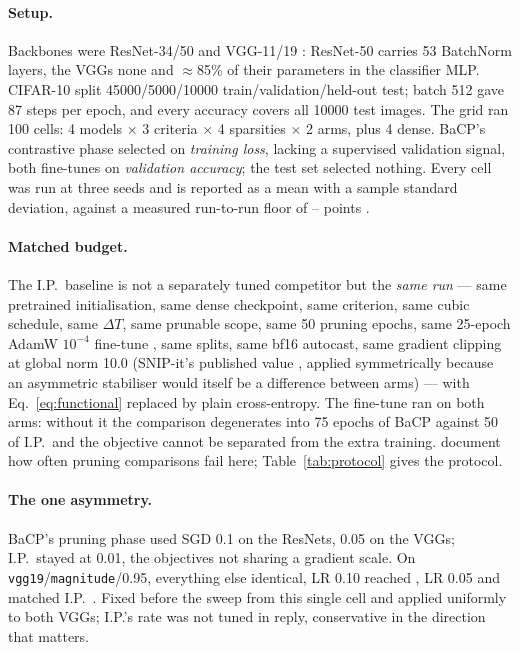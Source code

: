 \paragraph{Setup.}
Backbones were ResNet-34/50 \citep{he2016deep} and VGG-11/19
\citep{simonyan2015very}: ResNet-50 carries 53 BatchNorm layers, the VGGs none
and $\approx$85\% of their parameters in the classifier MLP. CIFAR-10
\citep{krizhevsky2009cifar} split \num{45000}/\num{5000}/\num{10000}
train/validation/held-out test; batch 512 gave 87 steps per epoch, and every
accuracy covers all \num{10000} test images. The grid ran 100 cells: 4 models
$\times$ 3 criteria $\times$ 4 sparsities $\times$ 2 arms, plus 4 dense.
BaCP's contrastive phase selected on \emph{training loss}, lacking a
supervised validation signal, both fine-tunes on \emph{validation accuracy};
the test set selected nothing. Every cell was run at three seeds and is
reported as a mean with a sample standard deviation, against a measured
run-to-run floor of --%
 points \citep{bouthillier2021variance}.

\paragraph{Matched budget.}
The I.P.\ baseline is not a separately tuned competitor but the \emph{same run}
--- same pretrained initialisation, same dense checkpoint, same criterion, same
cubic schedule, same $\Delta T$, same prunable scope, same 50 pruning epochs,
same 25-epoch AdamW $10^{-4}$ fine-tune \citep{loshchilov2019adamw}, same splits,
same bf16 autocast, same gradient clipping at global norm 10.0 (SNIP-it's
published value \citep{verdenius2020snipit}, applied symmetrically because an
asymmetric stabiliser would itself be a difference between arms) --- with
Eq.~\eqref{eq:functional} replaced by plain cross-entropy. The fine-tune ran on
both arms: without it the comparison degenerates into 75 epochs of BaCP against
50 of I.P.\ and the objective cannot be separated from the extra training.
\citet{blalock2020state} document how often pruning comparisons fail here;
Table~\ref{tab:protocol} gives the protocol.

\paragraph{The one asymmetry.}
\label{sec:experiments:vgglr}
BaCP's pruning phase used SGD 0.1 on the ResNets, 0.05 on the VGGs; I.P.\ stayed
at 0.01, the objectives not sharing a gradient scale. On
\texttt{vgg19}/\texttt{magnitude}/0.95, everything else identical, LR 0.10
reached , LR 0.05
 and matched I.P.\
. Fixed before the sweep from this single
cell and applied uniformly to both VGGs; I.P.'s rate was not tuned in reply,
conservative in the direction that matters.

